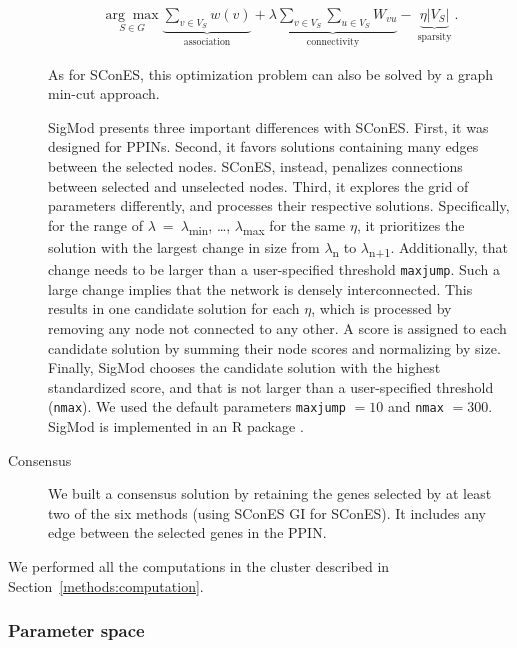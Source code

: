 \documentclass[10pt,letterpaper]{article}
\begin{document}
\begin{description}
\begin{eqnarray}
\underset{S \in G}{\arg \max } \underbrace{\sum_{v \in V_S} w(v)}_{\text { association }} + \underbrace{\lambda \sum_{v \in V_S} \sum_{u \in V_S} W_{vu} }_{\text { connectivity }} -\underbrace{\eta \lvert V_S \rvert }_{\text { sparsity }}.
\end{eqnarray}

As for SConES, this optimization problem can also be solved by a graph min-cut approach. 

SigMod presents three important differences with SConES. First, it was designed for PPINs. Second, it favors solutions containing many edges between the selected nodes. SConES, instead, penalizes connections between selected and unselected nodes. Third, it explores the grid of parameters differently, and processes their respective solutions. Specifically, for the range of \(\lambda\)~=~\(\lambda\)\textsubscript{min}, \dots{}, \(\lambda\)\textsubscript{max} for the same \(\eta\), it prioritizes the solution with the largest change in size from \(\lambda\)\textsubscript{n} to \(\lambda\)\textsubscript{n+1}. Additionally, that change needs to be larger than a user-specified threshold \texttt{maxjump}. Such a large change implies that the network is densely interconnected. This results in one candidate solution for each \(\eta\), which is processed by removing any node not connected to any other. A score is assigned to each candidate solution by summing their node scores and normalizing by size. Finally, SigMod chooses the candidate solution with the highest standardized score, and that is not larger than a user-specified threshold (\texttt{nmax}). We used the default parameters \texttt{maxjump} $ = 10$ and \texttt{nmax} $= 300$. SigMod is implemented in an R package \cite{sigmod}.

\item[{Consensus}] We built a consensus solution by retaining the genes selected by at least two of the six methods (using SConES GI for SConES). It includes any edge between the selected genes in the PPIN.
\end{description}

We performed all the computations in the cluster described in Section~\ref{methods:computation}. 

\subsubsection{Parameter space}
\label{methods:parameters}
\end{document}
